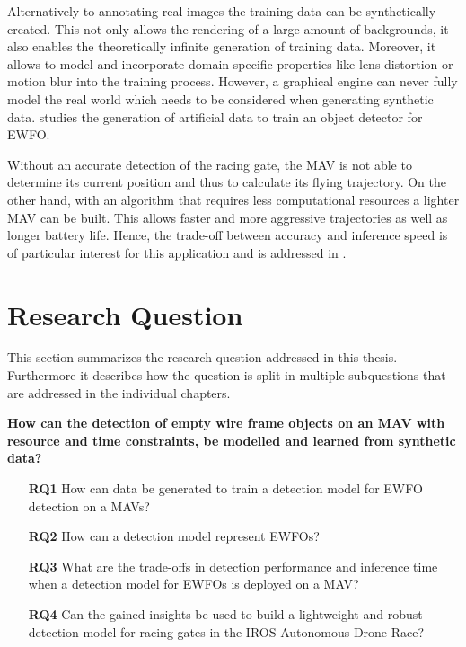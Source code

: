 Alternatively to annotating real images the training data can be synthetically created. This not only allows the rendering of a large amount of backgrounds, it also enables the theoretically infinite generation of training data. Moreover, it allows to model and incorporate domain specific properties like lens distortion or motion blur into the training process. However, a graphical engine can never fully model the real world which needs to be considered when generating synthetic data.  studies the generation of artificial data to train an object detector for \ac{EWFO}.

Without an accurate detection of the racing gate, the \ac{MAV} is not able to determine its current position and thus to calculate its flying trajectory. On the other hand, with an algorithm that requires less computational resources a lighter \ac{MAV} can be built. This allows faster and more aggressive trajectories as well as longer battery life. Hence, the trade-off between accuracy and inference speed is of particular interest for this application and is addressed in .

\section{Research Question}

This section summarizes the research question addressed in this thesis. Furthermore it describes how the question is split in multiple subquestions that are addressed in the individual chapters.

	\textbf{How can the detection of empty wire frame objects on an \ac{MAV} with resource and time constraints, be modelled and learned from synthetic data?}


\begin{enumerate}
	\item[\textbf{RQ1}]How can data be generated to train a detection model for \ac{EWFO} detection on a \acp{MAV}?
	\item[\textbf{RQ2}]How can a detection model represent \acp{EWFO}?
	\item[\textbf{RQ3}]What are the trade-offs in detection performance and inference time when a detection model for \acp{EWFO} is deployed on a \ac{MAV}?
	\item[\textbf{RQ4}]Can the gained insights be used to build a lightweight and robust detection model for racing gates in the \ac{IROS} Autonomous Drone Race?
\end{enumerate}

